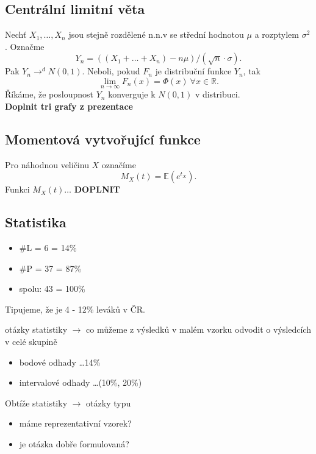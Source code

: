 \documentclass[../main.tex]{subfiles}
\begin{document}
\subsection{Centrální limitní věta}
\begin{theorem}
    Nechť $X_1,\dots,X_n$ jsou stejně rozdělené n.n.v se střední hodnotou $\mu$ a rozptylem $\sigma^2$. Označme
    \[Y_n = ((X_1 + \dots + X_n) - n\mu)/(\sqrt{n}\cdot\sigma).\]
    Pak $Y_n \rightarrow^d N(0,1)$. Neboli, pokud $F_n$ je distribuční funkce $Y_n$, tak
    \[\lim_{n \rightarrow \infty}F_n(x) = \Phi(x)\ \forall x\in \mathbb{R}.\]
    Říkáme, že posloupnost $Y_n$ konverguje k $N(0,1)$ v distribuci.
    \\ \textbf{Doplnit tri grafy z prezentace}
\end{theorem}

\subsection{Momentová vytvořující funkce}
\begin{definition}
    Pro náhodnou veličinu $X$ označíme
    \[M_X(t) = \mathbb{E}(e^{t_{X}}).\]
    Funkci $M_X(t)\dots$
    \textbf{DOPLNIT}
\end{definition}

\subsection{Statistika}
\begin{example}

    \begin{itemize}
        \item \#L = 6 = 14\%
        \item \#P = 37 = 87\%
        \item spolu: 43 = 100\%
    \end{itemize}
    Tipujeme, že je 4 - 12\% leváků v ČR.

    \begin{remark}

        otázky statistiky $\rightarrow$ co můžeme z výsledků v malém vzorku odvodit o výsledcích v celé skupině
        \begin{itemize}
        \item bodové odhady \dots 14\%
        \item intervalové odhady \dots (10\%, 20\%)
        \end{itemize}
        Obtíže statistiky $\rightarrow$ otázky typu
        \begin{itemize}
            \item máme reprezentativní vzorek?
            \item je otázka dobře formulovaná?
        \end{itemize}
    \end{remark}
\end{example}
\end{document}
